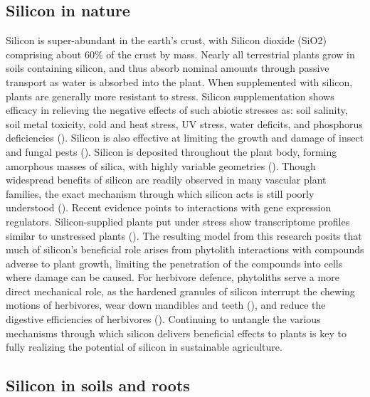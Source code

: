 \documentclass[12pt, letterpaper, ]{article}
\begin{document}
\subsection{Silicon in nature}

Silicon is super-abundant in the earth’s crust, with Silicon dioxide (SiO2) comprising about 60\% of the crust by mass. Nearly all terrestrial plants grow in soils containing silicon, and thus absorb nominal amounts through passive transport as water is absorbed into the plant. When supplemented with silicon, plants are generally more resistant to stress. Silicon supplementation shows efficacy in relieving the negative effects of such abiotic stresses as: soil salinity, soil metal toxicity, cold and heat stress, UV stress, water deficits, and phosphorus deficiencies (\cite{cooke_consistent_2016}). Silicon is also effective at limiting the growth and damage of insect and fungal pests (\cite{fauteux_silicon_2005,massey_herbivore_2007}). Silicon is deposited throughout the plant body, forming amorphous masses of silica, with highly variable geometries (\cite{piperno_phytoliths_2006}). Though widespread benefits of silicon are readily observed in many vascular plant families, the exact mechanism through which silicon acts is still poorly understood (\cite{coskun_controversies_2019}). Recent evidence points to interactions with gene expression regulators. Silicon-supplied plants put under stress show transcriptome profiles similar to unstressed plants (\cite{coskun_controversies_2019}). The resulting model from this research posits that much of silicon’s beneficial role arises from phytolith interactions with compounds adverse to plant growth, limiting the penetration of the compounds into cells where damage can be caused. For herbivore defence, phytoliths serve a more direct mechanical role, as the hardened granules of silicon interrupt the chewing motions of herbivores, wear down mandibles and teeth (\cite{stromberg_functions_2016,waterman_short-term_2021-1}), and reduce the digestive efficiencies of herbivores (\cite{johnson_silicon_2021}). Continuing to untangle the various mechanisms through which silicon delivers beneficial effects to plants is key to fully realizing the potential of silicon in sustainable agriculture. 

\subsection{Silicon in soils and roots}
\end{document}
